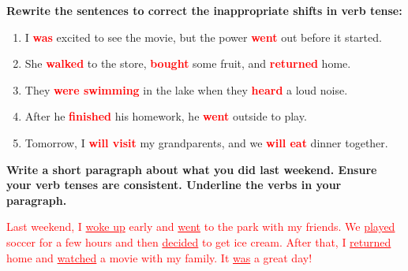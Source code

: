 \documentclass[12pt]{article}
\begin{document}
\vspace{1em}

\begin{tcolorbox}[colframe=black!60, colback=white, 
coltitle=black, colbacktitle=black!15, fonttitle=\bfseries\Large, 
title=Independent Practice, halign title=center, left=10pt, right=10pt, top=10pt, bottom=15pt]
\textbf{Rewrite the sentences to correct the inappropriate shifts in verb tense:}
\begin{enumerate}[itemsep=3em]
    \item I \textbf{\textcolor{red}{was}} excited to see the movie, but the power \textbf{\textcolor{red}{went}} out before it started.
    \item She \textbf{\textcolor{red}{walked}} to the store, \textbf{\textcolor{red}{bought}} some fruit, and \textbf{\textcolor{red}{returned}} home.
    \item They \textbf{\textcolor{red}{were swimming}} in the lake when they \textbf{\textcolor{red}{heard}} a loud noise.
    \item After he \textbf{\textcolor{red}{finished}} his homework, he \textbf{\textcolor{red}{went}} outside to play.
    \item Tomorrow, I \textbf{\textcolor{red}{will visit}} my grandparents, and we \textbf{\textcolor{red}{will eat}} dinner together.
\end{enumerate}
\end{tcolorbox}

\vspace{1em}

\begin{tcolorbox}[colframe=black!60, colback=white, 
coltitle=black, colbacktitle=black!15, fonttitle=\bfseries\Large, 
title=Exit Ticket, halign title=center, left=10pt, right=10pt, top=5pt, bottom=15pt]

\textbf{Write a short paragraph about what you did last weekend. Ensure your verb tenses are consistent. Underline the verbs in your paragraph.}

\vspace{1em}

\textcolor{red}{Last weekend, I \underline{woke up} early and \underline{went} to the park with my friends. We \underline{played} soccer for a few hours and then \underline{decided} to get ice cream. After that, I \underline{returned} home and \underline{watched} a movie with my family. It \underline{was} a great day!}

\end{tcolorbox}
\end{document}
